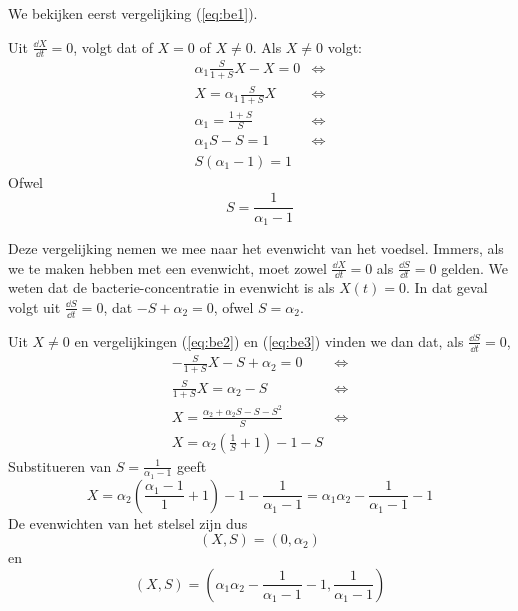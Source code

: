 We bekijken eerst vergelijking (\ref{eq:be1}).

Uit $\tfrac{\dd X}{\dd t} = 0$, volgt dat of $X = 0$ of $X \neq 0$. Als $X \not = 0$ volgt:
\begin{align*}
	\alpha_1 \frac{S}{1 + S} X - X = 0 &\iff \\
	X = \alpha_1 \frac{S}{1 + S}X &\iff \\
	\alpha_1 = \frac{1 + S}{S} &\iff \\
	\alpha_1S-S = 1 &\iff \\
	S(\alpha_1-1) = 1
\end{align*}
Ofwel
\begin{equation}
S=\frac{1}{\alpha_1-1}												\label{eq:be3}
\end{equation}

Deze vergelijking nemen we mee naar het evenwicht van het voedsel. Immers, als we te maken hebben met een evenwicht, moet zowel $\tfrac{\dd X}{\dd t} = 0$ als $\tfrac{\dd S}{ \dd t } = 0$ gelden. We weten dat de bacterie-concentratie in evenwicht is als $X(t) = 0$. In dat geval volgt uit $\tfrac{\dd S}{\dd t} = 0$, dat $-S+\alpha_2=0$, ofwel $S = \alpha_2$.

Uit $X\neq0$ en vergelijkingen (\ref{eq:be2}) en (\ref{eq:be3}) vinden we dan dat, als $\tfrac{\dd S}{\dd t} = 0$,
\begin{align*}
	- \frac{S}{1 + S}X - S + \alpha_2 = 0 		&\iff \\
	\frac{S}{1 + S}X = \alpha_2 - S 			&\iff \\
	X = \frac{\alpha_2 + \alpha_2 S - S - S^2}{S} &\iff \\
	X = \alpha_2 \left( \frac{1}{S} + 1 \right) - 1 - S
\end{align*}
Substitueren van $S = \frac{1}{\alpha_1-1}$ geeft
\begin{equation}
	X = \alpha_2 \left( \frac{\alpha_1 - 1}{1} + 1 \right) - 1 - \frac{1}{\alpha_1 - 1} = \alpha_1\alpha_2 - \frac{1}{\alpha_1 - 1} - 1
\end{equation}
De evenwichten van het stelsel zijn dus
\[
	(X,S) = (0, \alpha_2)
\]
en
\[
	(X,S) = \left( \alpha_1\alpha_2 - \frac{1}{\alpha_1 - 1} - 1, \frac{1}{\alpha_1-1} \right)
\]


